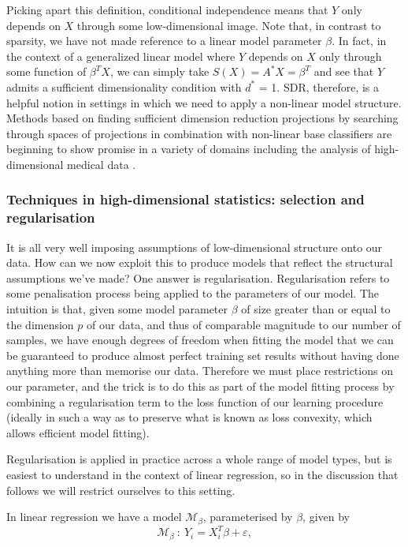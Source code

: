 \documentclass[thesis.tex]{subfiles}
\begin{document}
Picking apart this definition, conditional independence means that $Y$ only depends on $X$ through some low-dimensional image. Note that, in contrast to sparsity, we have not made reference to a linear model parameter $\beta$. In fact, in the context of a generalized linear model where $Y$ depends on $X$ only through some function of $\beta^TX$, we can simply take $S(X) = A^*X = \beta^T$ and see that $Y$ admits a sufficient dimensionality condition with $d^*$ = 1. SDR, therefore, is a helpful notion in settings in which we need to apply a non-linear model structure. Methods based on finding sufficient dimension reduction projections by searching through spaces of projections \citep{omidiran_high-dimensional_2010} in combination with non-linear base classifiers are beginning to show promise in a variety of domains  including the analysis of high-dimensional medical data \citep{cannings_random-projection_2017}.


\subsubsection{Techniques in high-dimensional statistics: selection and regularisation}
It is all very well imposing assumptions of low-dimensional structure onto our data. How can we now exploit this to produce models that reflect the structural assumptions we've made? One answer is regularisation. Regularisation refers to some penalisation process being applied to the parameters of our model. The intuition is that, given some model parameter $\beta$ of size greater than or equal to the dimension $p$ of our data, and thus of comparable magnitude to our number of samples, we have enough degrees of freedom when fitting the model that we can be guaranteed to produce almost perfect training set results without having done anything more than memorise our data. Therefore we must place restrictions on our parameter, and the trick is to do this as part of the model fitting process by combining a regularisation term to the loss function of our learning procedure (ideally in such a way as to preserve what is known as loss convexity, which allows efficient model fitting).

Regularisation is applied in practice across a whole range of model types, but is easiest to understand in the context of linear regression, so in the discussion that follows we will restrict ourselves to this setting. 

In linear regression we have a model $\mathcal{M}_\beta$, parameterised by $\beta$, given by 
\begin{equation}
\mathcal{M}_\beta \ : \ Y_i = X_i^T\beta + \varepsilon ,
\end{equation}
\end{document}

